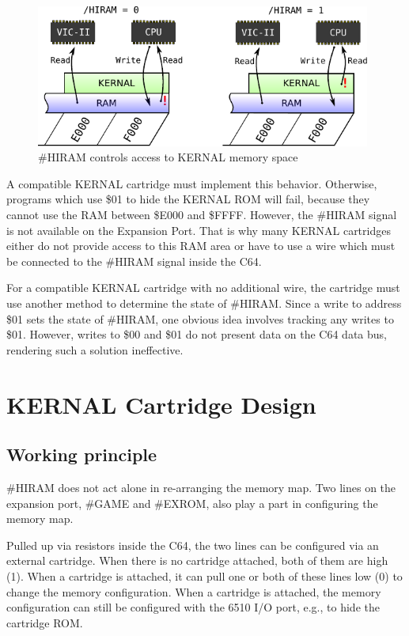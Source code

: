\documentclass[a4paper,oneside]{memoir}
\begin{document}
\begin{figure}
    \centering
    \includegraphics[width=11cm]{src/memory-map-hiram}
    \caption{\#HIRAM controls access to KERNAL memory space}
    \label{fig:memory-map-hiram}
\end{figure}

A compatible KERNAL cartridge must implement this behavior.
Otherwise, programs which use \$01 to hide the KERNAL ROM will fail,
because they cannot use the RAM between \$E000 and \$FFFF. However,
the \#HIRAM signal is not available on the Expansion Port. That is why
many KERNAL cartridges either do not provide access to this RAM area
or have to use a wire which must be connected to the \#HIRAM signal
inside the C64.

For a compatible KERNAL cartridge with no additional wire, the
cartridge must use another method to determine the state of \#HIRAM.
Since a write to address \$01 sets the state of \#HIRAM, one obvious
idea involves tracking any writes to \$01. However, writes to \$00
and \$01 do not present data on the C64 data bus, rendering such a
solution ineffective.

\chapter{KERNAL Cartridge Design}

\section{Working principle}

\#HIRAM does not act alone in re-arranging the memory map. Two lines
on the expansion port, \#GAME and \#EXROM, also play a part in
configuring the memory map.

Pulled up via resistors inside the C64, the two lines can be
configured via an external cartridge. When there is no cartridge
attached, both of them are high (1). When a cartridge is attached, it
can pull one or both of these lines low (0) to change the memory
configuration. When a cartridge is attached, the memory
configuration can still be configured with the 6510 I/O port, e.g.,
to hide the cartridge ROM.
\end{document}
